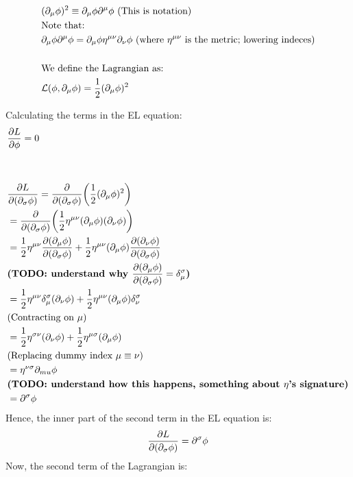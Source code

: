 \begin{align*}
    &(\partial_\mu \phi)^2 \equiv \partial_\mu \phi \partial^\mu \phi~\text{(This is notation)} \\
    &\text{Note that:} \\
    &\partial_\mu \phi \partial^\mu \phi = \partial_\mu \phi \eta^{\mu \nu} \partial_\nu \phi
    ~\text{(where $\eta^{\mu \nu}$ is the metric; lowering indeces)} \\
    \\
    &\text{We define the Lagrangian as:}\\
    &\mathcal{L}(\phi, \partial_\mu \phi) = \frac{1}{2}(\partial_\mu \phi)^2
\end{align*}

Calculating the terms in the EL equation:
\begin{align*}
    &\pdv{L}{\phi} = 0 \\
    \\
    \\
    &\pdv{L}{(\partial_\sigma \phi)}
    = \pdv{(\partial_\sigma \phi)} \bigg( \frac{1}{2}(\partial_\mu \phi)^2  \bigg) \\
    &=\pdv{(\partial_\sigma \phi)}  \bigg( \frac{1}{2}\eta^{\mu \nu} (\partial_\mu \phi) (\partial_\nu \phi) \bigg) \\
    &=\frac{1}{2}\eta^{\mu \nu} \pdv{(\partial_\mu \phi)}{(\partial_\sigma \phi)} (\partial_\nu \phi) +
    \frac{1}{2}\eta^{\mu \nu} (\partial_\mu \phi) \pdv{(\partial_\nu \phi)}{(\partial_\sigma \phi)} \\
    &\textbf{(TODO: understand why $\pdv{(\partial_\mu \phi)}{(\partial_\sigma \phi)}  = \delta_{\mu}^\sigma$)}
    \\
    &=\frac{1}{2}\eta^{\mu \nu} \delta_{\mu}^{\sigma} (\partial_\nu \phi) +
    \frac{1}{2}\eta^{\mu \nu} (\partial_\mu \phi) \delta_{\nu}^{\sigma} \\
    &\text{(Contracting on $\mu$)}\\
    &=\frac{1}{2}\eta^{\sigma \nu} (\partial_\nu \phi) +
    \frac{1}{2}\eta^{\mu \sigma} (\partial_\mu \phi) \\
    &\text{(Replacing dummy index $\mu \equiv \nu$)} \\
    &=\eta^{\nu \sigma} \partial_{mu} \phi \\
    &\textbf{(TODO: understand how this happens, something about $\eta$'s signature)} \\
    &=\partial^\sigma \phi
    \\
\end{align*}
    Hence, the inner part of the second term in the EL equation is:
\begin{equation}
    \pdv{L}{(\partial_\sigma \phi)}  = \partial^\sigma \phi
\end{equation}
Now, the second term of the Lagrangian is:

